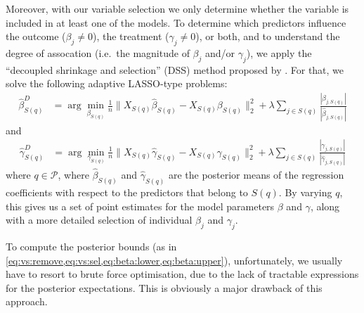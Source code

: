 \documentclass[preprint,12pt]{elsarticle}
\begin{document}
Moreover, with our variable selection we only determine whether the variable 
is included in at least one of the models.
To determine which predictors
influence the outcome ($\beta_j\neq 0$),
the treatment ($\gamma_j\neq 0$), or both,
and to understand the degree of assocation
(i.e.\ the magnitude of $\beta_j$ and/or $\gamma_j$),
we apply the 
``decoupled shrinkage and selection'' (DSS) method proposed by \citep{hahn2015}. 
For that, we solve the following adaptive LASSO-type \citep{Zou2006}
problems:
\begin{align}
	\hat{\beta}^D_{S(q)} &= 
	\arg\min_{\beta_{S(q)}} \frac{1}{n}\|X_{S(q)}\hat{\beta}_{S(q)}
	- X_{S(q)} \beta_{S(q)}\|_2^2 + \lambda\sum_{j\in S(q)} 
	\frac{|\beta_{j,S(q)}|}{|\hat{\beta}_{j,S(q)}|}
\end{align}
and
\begin{align}
	\hat{\gamma}^D_{S(q)} &= 
	\arg\min_{\gamma_{S(q)}} \frac{1}{n}\|X_{S(q)}\hat{\gamma}_{S(q)}
	- X_{S(q)} \gamma_{S(q)}\|_2^2 + \lambda\sum_{j\in S(q)} 
	\frac{|\gamma_{j,S(q)}|}{|\hat{\gamma}_{j,S(q)}|}
\end{align}
where $q\in \mathcal{P}$,
where $\hat{\beta}_{S(q)}$ 
and $\hat{\gamma}_{S(q)}$ are the posterior means 
of the regression coefficients with respect to
the predictors that belong to $S(q)$.
By varying $q$, this gives us a set of point estimates for the model parameters $\beta$ and $\gamma$, along with a more detailed selection of individual $\beta_j$ and $\gamma_j$.

To compute the posterior bounds (as in \cref{eq:vs:remove,eq:vs:sel,eq:beta:lower,eq:beta:upper}), unfortunately, we usually have to resort to brute force optimisation, due to the lack of tractable expressions for the posterior expectations. 
This is obviously a major drawback of this approach.

\end{document}
